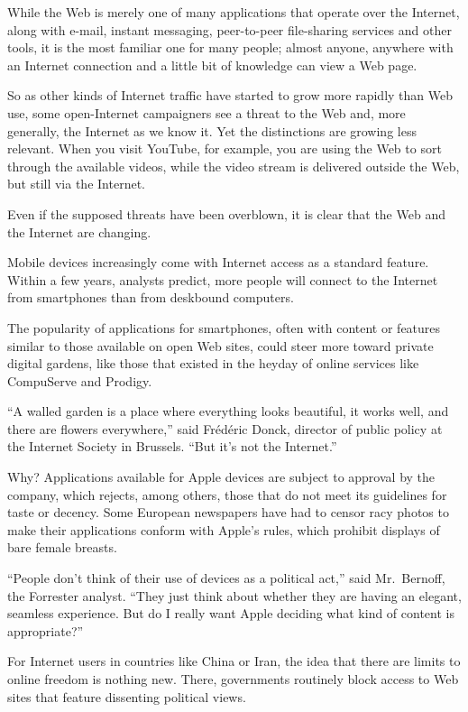 ﻿\documentclass[12pt]{article}
\begin{document}
While the Web is merely one of many applications that operate over the Internet, along with e-mail,
instant messaging, peer-to-peer file-sharing services and other tools, it is the most familiar one
for many people; almost anyone, anywhere with an Internet connection and a little bit of knowledge
can view a Web page.

So as other kinds of Internet traffic have started to grow more rapidly than Web use, some
open-Internet campaigners see a threat to the Web and, more generally, the Internet as we know it.
Yet the distinctions are growing less relevant. When you visit YouTube, for example, you are using
the Web to sort through the available videos, while the video stream is delivered outside the Web,
but still via the Internet.

Even if the supposed threats have been overblown, it is clear that the Web and the Internet are
changing.

Mobile devices increasingly come with Internet access as a standard feature. Within a few years,
analysts predict, more people will connect to the Internet from smartphones than from deskbound
computers.

The popularity of applications for smartphones, often with content or features similar to those
available on open Web sites, could steer more toward private digital gardens, like those that
existed in the heyday of online services like CompuServe and Prodigy.

``A walled garden is a place where everything looks beautiful, it works well, and there are flowers
everywhere,'' said Fr\'ed\'eric Donck, director of public policy at the Internet Society in
Brussels. ``But it's not the Internet.''

Why? Applications available for Apple devices are subject to approval by the company, which rejects,
among others, those that do not meet its guidelines for taste or decency. Some European newspapers
have had to censor racy photos to make their applications conform with Apple's rules, which prohibit
displays of bare female breasts.

``People don't think of their use of devices as a political act,'' said Mr.~Bernoff, the Forrester
analyst. ``They just think about whether they are having an elegant, seamless experience. But do I
really want Apple deciding what kind of content is appropriate?''

For Internet users in countries like China or Iran, the idea that there are limits to online freedom
is nothing new. There, governments routinely block access to Web sites that feature dissenting
political views.
\end{document}
